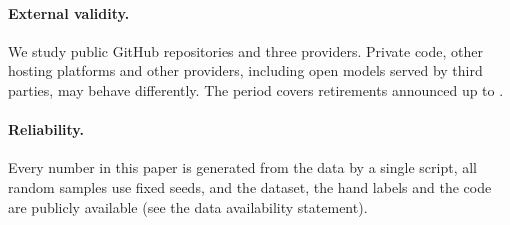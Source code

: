 \paragraph{External validity.} We study public GitHub repositories and three providers. Private code, other hosting platforms and other providers, including open models served by third parties, may behave differently. The period covers retirements announced up to \MiningEnd.

\paragraph{Reliability.} Every number in this paper is generated from the data by a single script, all random samples use fixed seeds, and the dataset, the hand labels and the code are publicly available (see the data availability statement).
